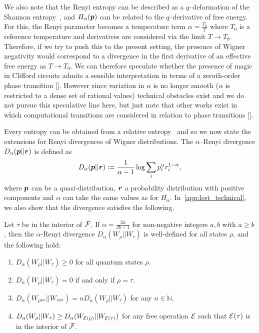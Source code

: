 \documentclass[pra,
aps,
twocolumn,
superscriptaddress,
groupedaddress,
nofootinbib,
reprint
]{revtex4-1}
\begin{document}
We also note that the Renyi entropy can be described as a $q$--deformation of the Shannon entropy~\cite{baez2011renyi}, and $H_\alpha(\boldsymbol{p})$ can be related to the $q$--derivative of free energy.  For this, the Renyi parameter becomes a temperature term $\alpha = \frac{T_0}{T}$ where $T_0$ is a reference temperature and derivatives are considered via the limit $T \rightarrow T_0$. Therefore, if we try to push this to the present setting, the presence of Wigner negativity would correspond to a divergence in the first derivative of an effective free energy as $T \rightarrow T_0$. We can therefore speculate whether the presence of magic in Clifford circuits admits a sensible interpretation in terms of a zeroth-order phase transition []. However since variation in $\alpha$ is no longer smooth ($\alpha$ is restricted to a dense set of rational values) technical obstacles exist and we do not pursue this speculative line here, but just note that other works exist in which computational transitions are considered in relation to phase transitions [].

Every entropy can be obtained from a relative entropy~\cite{Gour_2020} and so we now state the extensions for Renyi divergences of Wigner distributions.
The $\alpha$--Renyi divergence $D_\alpha(\boldsymbol{p}||\boldsymbol{r})$ is defined as
\begin{equation}
	D_\alpha(\boldsymbol{p} || \boldsymbol{r}) := \frac{1}{\alpha-1} \log \sum_i p_i^\alpha r_i^{1-\alpha},
\end{equation}
where $\boldsymbol{p}$ can be a quasi-distribution, $\boldsymbol{r}$ a probability distribution with positive components and $\alpha$ can take the same values as for $H_\alpha$.
In~\cref{app:lcst_technical}, we also show that the divergence satisfies the following.

\begin{theorem}\label{thm:Da_props} 
	Let $\tau$ be in the interior of ${\mathcal F}$. 
	If $\alpha = \frac{2a}{2b-1}$ for non-negative integers $a,b$ with $a \geq b$, then the $\alpha$-Renyi divergence $D_\alpha(W_\rho || W_\tau)$ is well-defined for all states $\rho$, and the following hold:
\begin{enumerate}
\item $D_\alpha(W_\rho || W_\tau) \ge 0$ for all quantum states $\rho$.
\item  $D_\alpha(W_\rho || W_\tau) = 0$ if and only if $\rho =\tau$.
\item $D_\alpha(W_{\rho^{\otimes n}} || W_{\tau^{\otimes n}}) = n D_\alpha(W_\rho || W_\tau)$ for any $n \in \mathbb{N}$.
\item $D_\alpha(W_\rho || W_\tau) \geq D_\alpha (W_{{\mathcal E}(\rho)} || W_{{\mathcal E}(\tau)})$ for any free operation ${\mathcal E}$ such that ${\mathcal E}(\tau)$ is in the interior of ${\mathcal F}$.
\end{enumerate}
\end{theorem}
\end{document}
